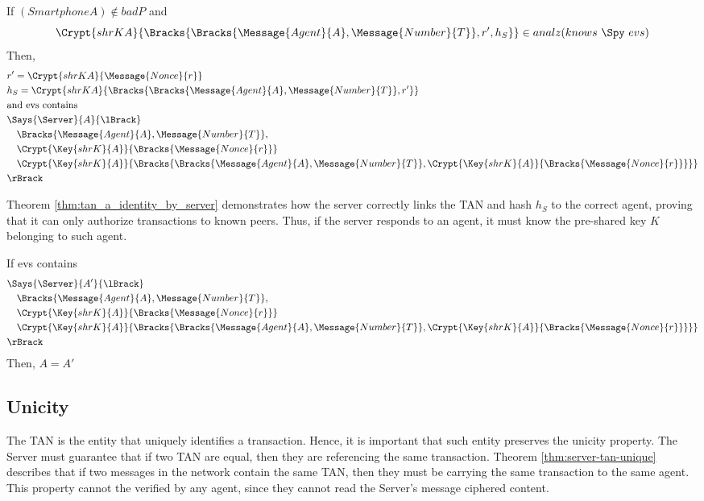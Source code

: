\begin{theorem}
\label{thm:ciphers-authentic}
  If $(Smartphone A) \notin badP$ and \\ 
  \[\Crypt{shrK A}{\Bracks{\Bracks{\Message{Agent}{A}, \Message{Number}{T}}, r', h_S}} \in analz(knows\ \Spy\ evs)\]
  Then,
  \begin{align*}
    & r' = \Crypt{shrK A}{\Message{Nonce}{r}} \\
    & h_S = \Crypt{shrK A}{\Bracks{\Bracks{\Message{Agent}{A}, \Message{Number}{T}}, r'}} \\
    & \text{and evs contains} \\
    & \Says{\Server}{A}{\lBrack} \\
      & \quad \Bracks{\Message{Agent}{A}, \Message{Number}{T}}, \\
      & \quad \Crypt{\Key{shrK}{A}}{\Bracks{\Message{Nonce}{r}}} \\
      & \quad \Crypt{\Key{shrK}{A}}{\Bracks{\Bracks{\Message{Agent}{A}, \Message{Number}{T}},\Crypt{\Key{shrK}{A}}{\Bracks{\Message{Nonce}{r}}}}} \\
    & \rBrack
  \end{align*}
\end{theorem}

Theorem \ref{thm:tan_a_identity_by_server} demonstrates how the server correctly links the TAN and hash \(h_S\) to the correct agent, proving that it can only authorize transactions to known peers. Thus, if the server responds to an agent, it must know the pre-shared key \(K\) belonging to such agent.

\begin{theorem}
  \label{thm:tan_a_identity_by_server}
  If evs contains
  \begin{align*}
    & \Says{\Server}{A'}{\lBrack} \\
      & \quad \Bracks{\Message{Agent}{A}, \Message{Number}{T}}, \\
      & \quad \Crypt{\Key{shrK}{A}}{\Bracks{\Message{Nonce}{r}}} \\
      & \quad \Crypt{\Key{shrK}{A}}{\Bracks{\Bracks{\Message{Agent}{A}, \Message{Number}{T}},\Crypt{\Key{shrK}{A}}{\Bracks{\Message{Nonce}{r}}}}} \\
    & \rBrack
  \end{align*}
  Then, $A = A'$
\end{theorem}



\subsection{Unicity}
The TAN is the entity that uniquely identifies a transaction. Hence, it is important that such entity preserves the unicity property. The Server must guarantee that if two TAN are equal, then they are referencing the same transaction. Theorem \ref{thm:server-tan-unique} describes that if two messages in the network contain the same TAN, then they must be carrying the same transaction to the same agent. This property cannot the verified by any agent, since they cannot read the Server's message ciphered content.

